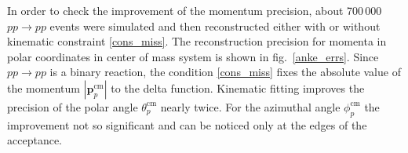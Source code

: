 






In order to check the improvement of the momentum precision, about 700\,000 $pp \to pp$ events were simulated and then reconstructed either with or without kinematic constraint \eqref{cons_miss}.
The reconstruction precision for momenta in polar coordinates in center of mass system is shown in fig.~\ref{anke_errs}.
Since $pp \to pp$ is a binary reaction, the condition \eqref{cons_miss} fixes the absolute value of the momentum $|\boldsymbol{p}_p^\mathrm{cm}|$ to the delta function.
Kinematic fitting improves the precision of the polar angle $\theta_p^\mathrm{cm}$ nearly twice.
For the azimuthal angle $\phi_p^\mathrm{cm}$ the improvement not so significant and can be noticed only at the edges of the acceptance.
